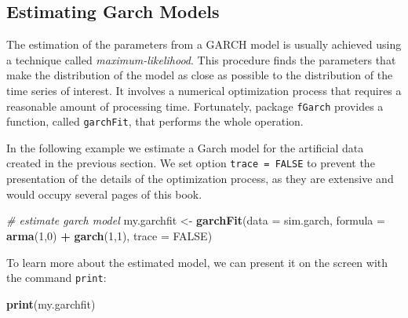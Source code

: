 \documentclass[11pt,]{book}
\newenvironment{Shaded}{\begin{snugshade}}{\end{snugshade}}
\newcommand{\KeywordTok}[1]{\textcolor[rgb]{0.27,0.27,0.27}{\textbf{#1}}}
\newcommand{\DataTypeTok}[1]{\textcolor[rgb]{0.27,0.27,0.27}{#1}}
\newcommand{\DecValTok}[1]{\textcolor[rgb]{0.06,0.06,0.06}{#1}}
\newcommand{\StringTok}[1]{\textcolor[rgb]{0.5,0.5,0.5}{#1}}
\newcommand{\CommentTok}[1]{\textcolor[rgb]{0.56,0.35,0.01}{\textit{#1}}}
\newcommand{\OtherTok}[1]{\textcolor[rgb]{0.56,0.35,0.01}{#1}}
\newcommand{\OperatorTok}[1]{\textcolor[rgb]{0.81,0.36,0.00}{\textbf{#1}}}
\newcommand{\NormalTok}[1]{#1}
\begin{document}
\subsection{Estimating Garch Models}\label{estimating-garch}

The estimation of the parameters from a GARCH model is usually achieved
using a technique called \emph{maximum-likelihood}. This procedure finds
the parameters that make the distribution of the model as close as
possible to the distribution of the time series of interest. It involves
a numerical optimization process that requires a reasonable amount of
processing time. Fortunately, package \texttt{fGarch} provides a
function, called \texttt{garchFit}, that performs the whole operation.

In the following example we estimate a Garch model for the artificial
data created in the previous section. We set option
\texttt{trace\ =\ FALSE} to prevent the presentation of the details of
the optimization process, as they are extensive and would occupy several
pages of this book.

\begin{Shaded}
\begin{Highlighting}[]
\CommentTok{# estimate garch model}
\NormalTok{my.garchfit <-}\StringTok{ }\KeywordTok{garchFit}\NormalTok{(}\DataTypeTok{data =}\NormalTok{ sim.garch, }
                        \DataTypeTok{formula =} \OperatorTok{~}\StringTok{ }\KeywordTok{arma}\NormalTok{(}\DecValTok{1}\NormalTok{,}\DecValTok{0}\NormalTok{) }\OperatorTok{+}\StringTok{ }\KeywordTok{garch}\NormalTok{(}\DecValTok{1}\NormalTok{,}\DecValTok{1}\NormalTok{), }
                        \DataTypeTok{trace =} \OtherTok{FALSE}\NormalTok{)}
\end{Highlighting}
\end{Shaded}

To learn more about the estimated model, we can present it on the screen
with the command \texttt{print}:

\begin{Shaded}
\begin{Highlighting}[]
\KeywordTok{print}\NormalTok{(my.garchfit)}
\end{Highlighting}
\end{Shaded}
\end{document}
